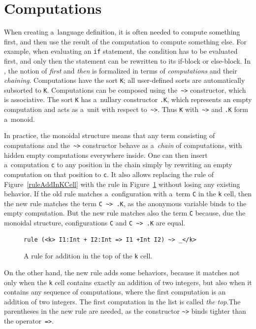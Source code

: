 \documentclass[nolot,nolof,nocover,printed]{fithesis3}
\begin{document}
\section{Computations}
When creating a~language definition, it is often needed to compute something first, and then use the result of the computation to compute something else. For example, when evaluating an \lstinline|if| statement, the condition has to be evaluated first, and only then the statement can be rewritten to its if-block or else-block. In \K, the notion of \textit{first} and \textit{then} is formalized in terms of \textit{computations} and their \textit{chaining}. Computations have the sort \lstinline|K|; all user-defined sorts are automatically subsorted to \lstinline|K|. Computations can be composed using the~\lstinline|~>| constructor, which is associative. The sort \lstinline|K| has a~nullary constructor \lstinline|.K|, which represents an empty computation and acts as a~unit with respect to~\lstinline|~>|. Thus \lstinline|K| with~\lstinline|~>| and \lstinline|.K| form a~monoid.

In practice, the monoidal structure means that any term consisting of computations and the~\lstinline|~>| constructor behave as a~\textit{chain} of computations, with hidden empty computations everywhere inside. One can then insert a~computation \lstinline|c| to any position in the chain simply by rewriting an empty computation on that position to \lstinline|c|. It also allows replacing the rule of Figure~\ref{ruleAddInKCell} with the rule in Figure~\ref{fig:ruleAddInTopOfKCell} without losing any existing behavior. If the old rule matches a~configuration with a~term \lstinline|C| in the \lstinline|k| cell, then the new rule matches the term \lstinline|C ~> .K|, as the anonymous variable binds to the empty computation. But the new rule matches also the term \lstinline|C| because, due the monoidal structure, configurations \lstinline|C| and \lstinline|C ~> .K| are equal.

\begin{figure}[ht]
\begin{lstlisting}
rule (<k> I1:Int + I2:Int => I1 +Int I2) ~> _</k>
\end{lstlisting}
\caption{A rule for addition in the top of the \lstinline|k| cell.}
\label{fig:ruleAddInTopOfKCell}
\end{figure}

On the other hand, the new rule adds some behaviors, because it matches not only when the \lstinline|k| cell contains exactly an addition of two integers, but also when it contains any sequence of computations, where the first computation is an addition of two integers. The first computation in the list is called \textit{the top}.The parentheses in the new rule are needed, as the constructor \lstinline|~>| binds tighter than the operator~\lstinline|=>|.
\end{document}
